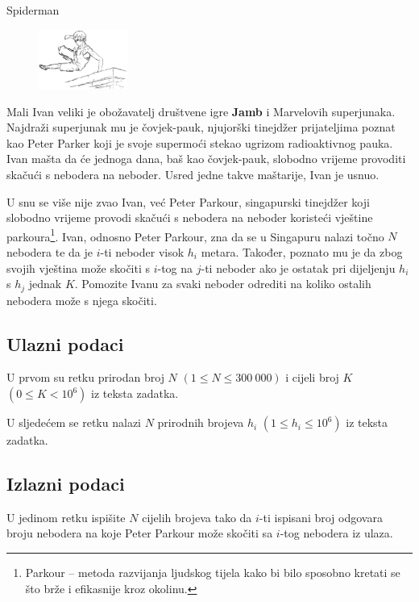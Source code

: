 \begin{statement}[
  problempoints=70,
  timelimit=1 sekunda,
  memorylimit=512 MiB,
]{Spiderman}

\setlength\intextsep{-0.1cm}
\begin{figure}
\centering
\includegraphics[width=0.26\textwidth]{img/spiderman.png}
\end{figure}

Mali Ivan veliki je obožavatelj društvene igre \textbf{Jamb} i Marvelovih
superjunaka.  Najdraži superjunak mu je čovjek-pauk, njujorški tinejdžer
prijateljima poznat kao Peter Parker koji je svoje supermoći stekao ugrizom
radioaktivnog pauka. Ivan mašta da će jednoga dana, baš kao čovjek-pauk,
slobodno vrijeme provoditi skačući s nebodera na neboder.  Usred jedne takve
maštarije, Ivan je usnuo.

U snu se više nije zvao Ivan, već Peter Parkour, singapurski tinejdžer koji
slobodno vrijeme provodi skačući s nebodera na neboder koristeći vještine
parkoura\footnote{Parkour -- metoda razvijanja ljudskog tijela kako bi bilo
sposobno kretati se što brže i efikasnije  kroz okolinu.}. Ivan, odnosno
Peter Parkour, zna da se u Singapuru nalazi točno $N$ nebodera te da je
$i$-ti neboder visok $h_i$ metara. Također, poznato mu je da zbog svojih
vještina može skočiti s $i$-tog na $j$-ti neboder ako je ostatak pri
dijeljenju $h_i$ s $h_j$ jednak $K$.  Pomozite Ivanu za svaki neboder
odrediti na koliko ostalih nebodera može s njega skočiti.

\subsection*{Ulazni podaci}
U prvom su retku prirodan broj $N$ $(1 \le N \le 300\ 000)$ i cijeli broj $K$
$(0 \le K < 10^6)$ iz teksta zadatka.

U sljedećem se retku nalazi $N$ prirodnih brojeva $h_i$ $(1 \le h_i \le 10^6)$
iz teksta zadatka.

\subsection*{Izlazni podaci}
U jedinom retku ispišite $N$ cijelih brojeva tako da $i$-ti ispisani broj
odgovara broju nebodera na koje Peter Parkour može skočiti sa $i$-tog
nebodera iz ulaza.


\end{statement}
